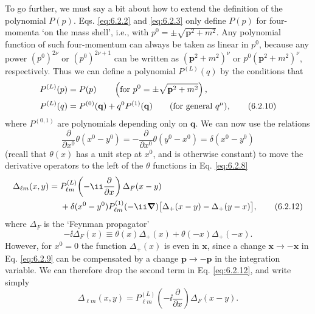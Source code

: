 To go further, we must say a bit about how to extend the definition of the
polynomial $P(p)$. Eqs. \eqref{eq:6.2.2} and \eqref{eq:6.2.3} only define $P(p)$ for
four-momenta `on the mass shell', i.e., with
$p^0=\pm\sqrt{\mathbf p^2+m^2}$. Any polynomial function of such four-momentum
can always be taken as linear in $p^0$, because any power $(p^0)^{2\nu}$ or
$(p^0)^{2\nu+1}$ can be written as $(\mathbf p^2+m^2)^\nu$ or
$p^0(\mathbf p^2+m^2)^\nu$, respectively. Thus we can define a polynomial
$P^{(L)}(q)$ by the conditions that
\begin{align}
P^{(L)}(p)={}&P(p)
 \qquad\left(\text{for }p^0=\pm\sqrt{\mathbf p^2+m^2}\right),
\notag\\
P^{(L)}(q)={}&P^{(0)}(\mathbf q)+q^0P^{(1)}(\mathbf q)
 \qquad(\text{for general }q^\mu),
\tag{6.2.10}
\label{eq:6.2.10}
\end{align}
where $P^{(0,1)}$ are polynomials depending only on $\mathbf q$. We can now use
the relations
\begin{equation}
\frac{\partial}{\partial x^0}\theta(x^0-y^0)
=-\frac{\partial}{\partial x^0}\theta(y^0-x^0)
=\delta(x^0-y^0)
\tag{6.2.11}
\label{eq:6.2.11}
\end{equation}
(recall that $\theta(x)$ has a unit step at $x^0$, and is otherwise constant)
to move the derivative operators to the left of the $\theta$ functions in Eq.
\eqref{eq:6.2.8}
\begin{align}
\Delta_{\ell m}(x,y)={}&P_{\ell m}^{(L)}\!\left(
 -\ii\frac{\partial}{\partial x}\right)\Delta_F(x-y)
\notag\\
&+\delta(x^0-y^0)P_{\ell m}^{(1)}(-\ii\boldsymbol\nabla)
 \bigl[\Delta_+(x-y)-\Delta_+(y-x)\bigr],
\tag{6.2.12}
\label{eq:6.2.12}
\end{align}
where $\Delta_F$ is the `Feynman propagator'
\begin{equation}
-\ii\Delta_F(x)\equiv\theta(x)\Delta_+(x)+\theta(-x)\Delta_+(-x).
\tag{6.2.13}
\label{eq:6.2.13}
\end{equation}
However, for $x^0=0$ the function $\Delta_+(x)$ is even in $\mathbf x$, since
a change $\mathbf x\to-\mathbf x$ in Eq. \eqref{eq:6.2.9} can be compensated by a
change $\mathbf p\to-\mathbf p$ in the integration variable. We can therefore
drop the second term in Eq. \eqref{eq:6.2.12}, and write simply
\begin{equation}
\Delta_{\ell m}(x,y)=P_{\ell m}^{(L)}\!\left(
 -\ii\frac{\partial}{\partial x}\right)\Delta_F(x-y).
\tag{6.2.14}
\label{eq:6.2.14}
\end{equation}


